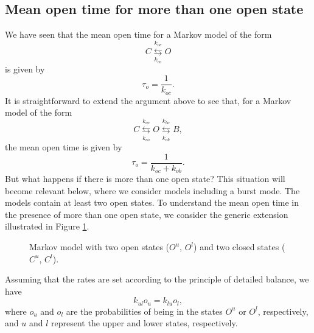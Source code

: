 \subsection{Mean open time for more than one open state}
\label{mot_many}


We have seen that the mean open time for a Markov model of the form
\[
C\underset{k_{co}}{\overset{k_{oc}}{\leftrightarrows}}O
\]
is given by
\begin{equation}
\tau_{o}=\frac{1}{k_{oc}}. 
\end{equation}
It is straightforward to extend the argument above to see that, for a Markov
model of the form 
\[
C\underset{k_{co}}{\overset{k_{oc}}{\leftrightarrows}}O\underset{k_{ob}}{\overset{k_{bo}}{\leftrightarrows}}B,
\]
the mean open time is given by
\begin{equation}
\tau_{o}=\frac{1}{k_{oc}+k_{ob}}. 
\end{equation}
But what happens if there is more than one open state? This situation
will become relevant below, where we consider models including a burst mode.
The models contain at least two open states. To understand the mean
open time in the presence of more than one open state, we consider the
generic extension illustrated in Figure \ref{o2}.


\begin{figure}[ptb]
\begin{center}
\end{center}
\caption{Markov model with two open states ($O^{u}$, $O^{l}$) and two closed states ($C^{u}$, $C^{l}$).}
\label{o2}
\end{figure}
Assuming that the rates are set according to the principle of detailed balance,
 we have
\[k_{ul}o_{u}=k_{lu}o_{l}, \]
where $o_{u}$ and $o_{l}$ are the probabilities of being in the states 
$O^{u}$ or $O^{l}$, respectively, and $u$ and $l$ represent the upper and lower states,
respectively. 

